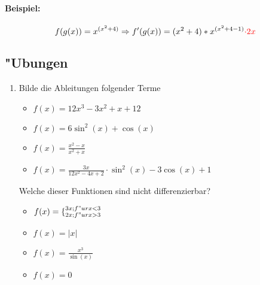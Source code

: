 \paragraph{Beispiel:}
\begin{equation*}
f(g(x))=x^{(x^2+4)}\Rightarrow f'(g(x))=(x^2+4)*x^{(x^2+4-1)}\textcolor{red}{ \cdot 2x}
\end{equation*}

\subsection{"Ubungen}
\begin{enumerate}
\item Bilde die Ableitungen folgender Terme
\begin{itemize}
\item $f(x)=12x^3 - 3x^2 + x + 12$
\item $f(x)= 6 \sin^2(x) + \cos(x) $
\item $f(x)= \frac{x^2-x}{x^2+x}$
\item $f(x)= \frac{3x}{12x^2 - 4x + 2} \cdot \sin^2(x) - 3 \cos(x) + 1$
\end{itemize}
Welche dieser Funktionen sind nicht differenzierbar?
\begin{itemize}
\item $f(x)=\lbrace^{3x; f"ur x < 3}_{2x; f"ur x>3}$
\item $f(x)=|x|$
\item $f(x)= \frac{x^3}{\sin(x)}$
\item $f(x)= 0$
\end{itemize}
\end{enumerate}